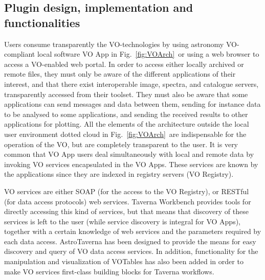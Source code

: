 \documentclass{aa}
\begin{document}
\subsection{Plugin design, implementation and functionalities}
\label{Opening}

Users consume transparently the VO-technologies by using astronomy VO-compliant local software \textendash VO App in Fig.~\ref{fig:VOArch}\textendash\ or using a web browser to access a VO-enabled web portal. In order to access either locally archived or remote files, they must only be aware of the different applications of their interest, and that there exist interoperable image, spectra, and catalogue servers, transparently accessed from their toolset. They must also be aware that some applications can send messages and data between them, sending for instance data to be analysed to some applications, and sending the received results to other applications for plotting. All the elements of the architecture outside the local user environment \textendash dotted cloud in Fig.~\ref{fig:VOArch}\textendash\ are indispensable for the operation of the VO, but are completely transparent to the user. It is very common that VO App users deal simultaneously with local and remote data by invoking VO services encapsulated in the VO Apps. These services are known by the applications since they are indexed in registry servers (VO Registry).

VO services are either SOAP (for the access to the VO Registry), or RESTful (for data access protocols) web services. Taverna Workbench provides tools for directly accessing this kind of services, but that means that discovery of these services is left to the user (while service discovery is integral for VO Apps), together with a certain knowledge of web services and the parameters required by each data access. AstroTaverna has been designed to provide the means for easy discovery and query of VO data access services. In addition, functionality for the manipulation and visualization of VOTables has also been added in order to make VO services first-class building blocks for Taverna workflows.
\end{document}
